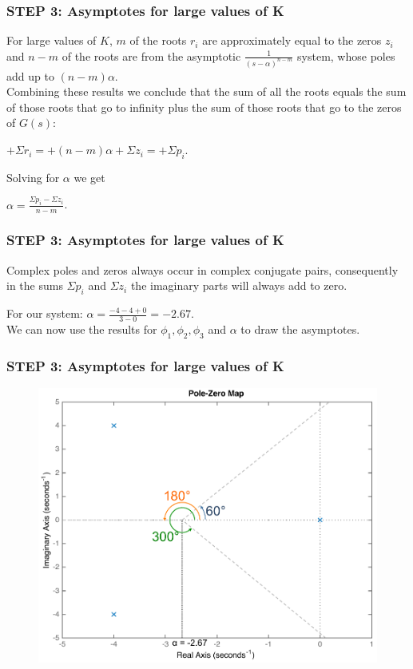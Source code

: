 \begin{frame}
\frametitle{STEP 3: Asymptotes for large values of K}
\justify
	For large values of $K$, $m$ of the roots $r_i$ are approximately equal to the zeros $z_i$ and $n-m$ of the roots are from the asymptotic $\frac{1}{(s-\alpha)^{n-m}}$ system, whose poles add up to $(n-m)\alpha$.\\
	\vspace{1em}
	Combining these results we conclude that the sum of all the roots equals the sum of those roots that go to infinity plus the sum of those roots that go to the zeros of $G(s)$:
	\begin{center}
		$+\Sigma r_i = + (n-m)\alpha + \Sigma z_i = +\Sigma p_i$.
	\end{center}
	Solving for $\alpha$ we get 
	\begin{center}
		$\alpha = \frac{\Sigma p_i - \Sigma z_i}{n-m}$.
	\end{center}
\end{frame}

\begin{frame}
\frametitle{STEP 3: Asymptotes for large values of K}
\justify
	Complex poles and zeros always occur in complex conjugate pairs, consequently in the sums $\Sigma p_i$ and $\Sigma z_i$ the imaginary parts will always add to zero.\\
	\vspace{0.5em}
	\begin{exampleblock}{}
	For our system: $\alpha = \frac{-4-4+0}{3-0} = -2.67.$\\
	\vspace{1em}
	We can now use the results for $\phi_1, \phi_2, \phi_3$ and $\alpha$ to draw the asymptotes. 
	\end{exampleblock}
\end{frame}

\begin{frame}
\frametitle{STEP 3: Asymptotes for large values of K}
	\begin{exampleblock}{}
		\begin{figure}
			\centering
			\includegraphics[width=0.7\linewidth]{how_to_draw_ex3}
		\end{figure}
	\end{exampleblock}
\end{frame}

